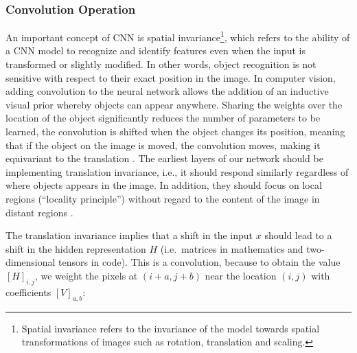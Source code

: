 \documentclass[12pt,a4paper]{scrartcl}
\begin{document}
\subsubsection{Convolution Operation}
An important concept of CNN is spatial invariance\footnote{Spatial invariance refers to the invariance of the model towards spatial transformations of images such as rotation, translation and scaling.}, which refers to the ability of a CNN model to recognize and identify features even when the input is transformed or slightly modified. In other words, object recognition is not sensitive with respect to their exact position in the image. In computer vision, adding convolution to the neural network allows the addition of an inductive visual prior whereby objects can appear anywhere. Sharing the weights over the location of the object significantly reduces the number of parameters to be learned, the convolution is shifted when the object changes its position, meaning that if the object on the image is moved, the convolution moves, making it equivariant to the translation  \cite{CNNSpatialLocation}. The earliest layers of our network should be implementing translation invariance, i.e., it should respond similarly regardless of where objects appears in the image. In addition, they should focus on local regions (``locality principle'') without regard to the content of the image in distant regions \cite{DIDLBook}.

The translation invariance implies that a shift in the input \(x\) should lead to a shift in the hidden representation \(H\) (i.e.~matrices in mathematics and two-dimensional tensors in code). 
This is a convolution, because to obtain the value \([H]_{i,j}\), we weight the pixels at \((i + a, j + b)\) near the location \((i, j)\) with coefficients \([V]_{a,b}\):
 
\end{document}
